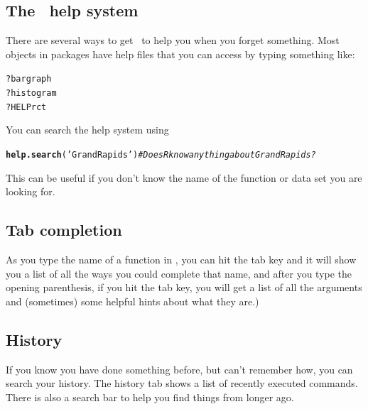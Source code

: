 \documentclass[twoside]{book}\usepackage[]{graphicx}\usepackage[]{xcolor}
\makeatletter
\newcommand{\hlstr}[1]{\textcolor[rgb]{0.192,0.494,0.8}{#1}}%
\newcommand{\hlcom}[1]{\textcolor[rgb]{0.678,0.584,0.686}{\textit{#1}}}%
\newcommand{\hlopt}[1]{\textcolor[rgb]{0,0,0}{#1}}%
\newcommand{\hlstd}[1]{\textcolor[rgb]{0.345,0.345,0.345}{#1}}%
\newcommand{\hlkwd}[1]{\textcolor[rgb]{0.737,0.353,0.396}{\textbf{#1}}}%
\newenvironment{kframe}{%
 \def\at@end@of@kframe{}%
 \ifinner\ifhmode%
  \def\at@end@of@kframe{\end{minipage}}%
  \begin{minipage}{\columnwidth}%
 \fi\fi%
 \def\FrameCommand##1{\hskip\@totalleftmargin \hskip-\fboxsep
 \colorbox{shadecolor}{##1}\hskip-\fboxsep
     \hskip-\linewidth \hskip-\@totalleftmargin \hskip\columnwidth}%
 \MakeFramed {\advance\hsize-\width
   \@totalleftmargin\z@ \linewidth\hsize
   \@setminipage}}%
 {\par\unskip\endMakeFramed%
 \at@end@of@kframe}
\newenvironment{knitrout}{}{} %
\makeatother
\begin{document}
\subsection{The \RStudio\ help system}
There are several ways to get \RStudio\ to help you when you forget something.
Most objects in packages have help files that you can access by typing something 
like:
\begin{knitrout}
\color{fgcolor}\begin{kframe}
\begin{alltt}
\hlopt{?}\hlstd{bargraph}
\hlopt{?}\hlstd{histogram}
\hlopt{?}\hlstd{HELPrct}
\end{alltt}
\end{kframe}
\end{knitrout}
You can search the help system using
\begin{knitrout}
\color{fgcolor}\begin{kframe}
\begin{alltt}
\hlkwd{help.search}\hlstd{(}\hlstr{'Grand Rapids'}\hlstd{)}    \hlcom{# Does R know anything about Grand Rapids?}
\end{alltt}
\end{kframe}
\end{knitrout}
This can be useful if you don't know the name of the function or data set you 
are looking for.

\subsection{Tab completion}
As you type the name of a function in \RStudio, you can hit the tab key and it
will show you a list of all the ways you could complete that name, and after
you type the opening parenthesis, if you hit the tab key, you will get a list
of all the arguments and (sometimes) some helpful hints about what they are.)

\subsection{History}
If you know you have done something before, but can't remember how, you can
search your history.  The history tab shows a list of recently executed
commands.  There is also a search bar to help you find things from longer ago.
\end{document}

